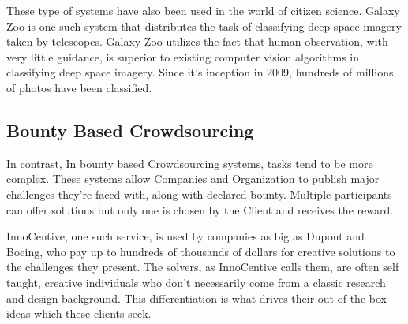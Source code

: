  These type of systems have also been used in the world of citizen science\cite{sauermann2015crowd}. Galaxy Zoo is one such system that distributes the task of classifying deep space imagery taken by telescopes\cite{galaxyzoo}. Galaxy Zoo utilizes the fact that human observation, with very little guidance, is superior to existing computer vision algorithms in classifying deep space imagery. Since it's inception in 2009, hundreds of millions of photos have been classified. 

\subsection{Bounty Based Crowdsourcing}

In contrast, In bounty based Crowdsourcing systems, tasks tend to be more complex. These systems allow Companies and Organization to publish major challenges they're faced with, along with declared bounty. Multiple participants can offer solutions but only one is chosen by the Client and receives the reward.   

InnoCentive\cite{innocentive}, one such service, is used by companies as big as Dupont and Boeing, who pay up to hundreds of thousands of dollars for creative solutions to the challenges they present. The solvers, as InnoCentive calls them, are often self taught, creative individuals who don't necessarily come from a classic research and design background. This differentiation is what drives their out-of-the-box ideas which these clients seek. \cite{howe2006rise}

